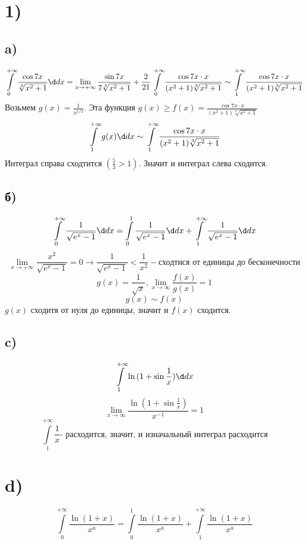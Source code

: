 

	\section*{1)}
	\subsection*{a)}
	$$\int\limits_0^{+\infty}\frac{\cos{7x}}{\sqrt[3]{x^2+1}}\dx =\lim_{x\to+\infty}\frac{\sin{7x}}{7\sqrt[3]{x^2+1}}+\frac{2}{21}\int\limits_0^{+\infty}\frac{\cos{7x}\cdot x}{(x^2+1)\sqrt[3]{x^2+1}} \sim\int\limits_1^{+\infty}\frac{\cos{7x}\cdot x}{(x^2+1)\sqrt[3]{x^2+1}} $$
	Возьмем $g(x) = \frac{1}{x^{5/3}}$. Эта функция $g(x)\ge f(x) = \frac{\cos{7x}\cdot x}{(x^2+1)\sqrt[3]{x^2+1}} $\\
	$$\int\limits_1^{+\infty} g(x)\dx \sim \int\limits_1^{+\infty}\frac{\cos{7x}\cdot x}{(x^2+1)\sqrt[3]{x^2+1}}$$
	Интеграл справа сходтится $(\frac{5}{3}>1)$. Значит и интеграл слева сходится. 
	\subsection*{б)}
$$\int\limits_0^{+\infty} \frac{1}{\sqrt{e^x-1}}\dx = \int\limits_0^1\frac{1}{\sqrt{e^x-1}}\dx + \int\limits_1^{+\infty}\frac{1}{\sqrt{e^x-1}}\dx$$
$$\lim_{x\to+\infty}\frac{x^2}{\sqrt{e^x-1}} = 0\to \frac{1}{\sqrt{e^x-1}}< \frac{1}{x^2} - \text{сходтися от единицы до бесконечности}$$
$$g(x) = \frac{1}{\sqrt x}, \lim_{x\to\infty}\frac{f(x)}{g(x)} = 1$$
$$g(x)\sim f(x)$$ 
$g(x)$ сходитя от нуля до единицы, значит и $f(x)$
сходится.
\subsection*{c)}
$$\int\limits_1^{+\infty}\ln{(1+\sin{\frac1x})}\dx$$
$$\lim_{x\to\infty}\frac{\ln{(1+\sin{\frac1x})}}{x^{-1}} = 1$$
$$\int\limits_1^{+\infty} \frac1x \text{- расходится, значит, и изначальный интеграл расходится}$$
\section*{d)}
$$\int\limits_0^{+\infty}\frac{\ln(1+x)}{x^a} =\int\limits_0^{1}\frac{\ln(1+x)}{x^a} + \int\limits_1^{+\infty}\frac{\ln(1+x)}{x^a} $$

